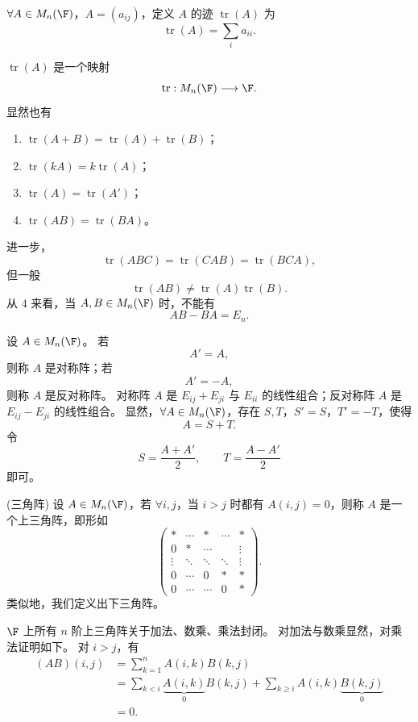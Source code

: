 \begin{definition}
	$\forall A\in M_n(\F)$，$A=(a_{ij})$，定义 $A$ 的迹 $\operatorname{tr}(A)$ 为
	\[
	\operatorname{tr}(A)=\sum_i a_{ii}.
	\]
	
\end{definition}
$\operatorname{tr}(A)$ 是一个映射
\[
\operatorname{tr}:M_n(\F)\longrightarrow\F.
\]
显然也有
\begin{enumerate}
	\item $\operatorname{tr}(A+B)=\operatorname{tr}(A)+\operatorname{tr}(B)$；
	\item $\operatorname{tr}(kA)=k\operatorname{tr}(A)$；
	\item $\operatorname{tr}(A)=\operatorname{tr}(A')$；
	\item $\operatorname{tr}(AB)=\operatorname{tr}(BA)$。
\end{enumerate}
进一步，
\[
\operatorname{tr}(ABC)=\operatorname{tr}(CAB)=\operatorname{tr}(BCA),
\]
但一般
\[
\operatorname{tr}(AB)\neq\operatorname{tr}(A)\operatorname{tr}(B).
\]
从 $4$ 来看，当 $A,B\in M_n(\F)$ 时，不能有
\[
AB-BA=E_n.
\]
\begin{definition}
	设 $A\in M_n(\F)$。
	若
	\[
	A'=A,
	\]
	则称 $A$ 是对称阵；若
	\[
	A'=-A,
	\]
	则称 $A$ 是反对称阵。
	对称阵 $A$ 是 $E_{ij}+E_{ji}$ 与 $E_{ii}$ 的线性组合；反对称阵 $A$ 是 $E_{ij}-E_{ji}$ 的线性组合。
	显然，$\forall A\in M_n(\F)$，存在 $S,T$，$S'=S$，$T'=-T$，使得
	\[
	A=S+T.
	\]
	令
	\[
	S=\frac{A+A'}{2},
	\qquad
	T=\frac{A-A'}{2}
	\]
	即可。
\end{definition}

\begin{definition}(三角阵)
	设 $A\in M_n(\F)$，若 $\forall i,j$，当 $i>j$ 时都有 $A(i,j)=0$，则称 $A$ 是一个上三角阵，即形如
	\[
	\begin{pmatrix}
		*&\cdots&*&\cdots&*\\
		0&*&\cdots& &\vdots\\
		\vdots&\ddots&\ddots&\ddots&\vdots\\
		0&\cdots&0&*&*\\
		0&\cdots&\cdots&0&*
	\end{pmatrix}.
	\]
	类似地，我们定义出下三角阵。
\end{definition}

$\F$ 上所有 $n$ 阶上三角阵关于加法、数乘、乘法封闭。
对加法与数乘显然，对乘法证明如下。
对 $i>j$，有
\[
\begin{aligned}
	(AB)(i,j)
	&=\sum_{k=1}^{n}A(i,k)B(k,j)\\
	&=\sum_{k<i}\underbrace{A(i,k)}_{0}B(k,j)
	+\sum_{k\geq i}A(i,k)\underbrace{B(k,j)}_{0}\\
	&=0.
\end{aligned}
\]

